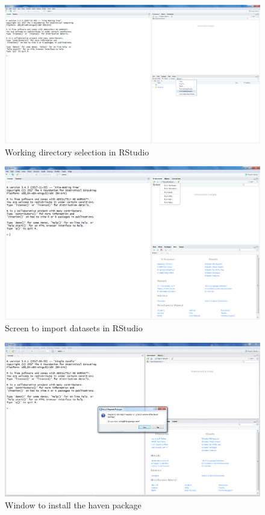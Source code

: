 \documentclass[]{book}
\theoremstyle{definition}
\theoremstyle{definition}
\theoremstyle{definition}
\theoremstyle{remark}
\begin{document}
\begin{figure}

{\centering \includegraphics[width=0.9\linewidth]{images/fig1.12} 

}

\caption{Working directory selection in RStudio}\label{fig:fig12}
\end{figure}

\begin{figure}

{\centering \includegraphics[width=0.9\linewidth]{images/fig1.13} 

}

\caption{Screen to import datasets in RStudio}\label{fig:fig13}
\end{figure}

\begin{figure}

{\centering \includegraphics[width=0.9\linewidth]{images/fig1.14} 

}

\caption{Window to install the haven package}\label{fig:fig14}
\end{figure}
\end{document}
